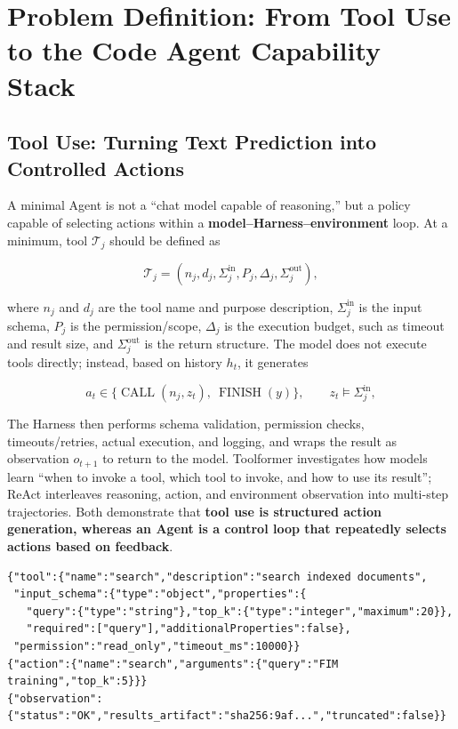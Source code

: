 \documentclass[10pt,a4paper,UTF8,fontset=none]{ctexart}
\begin{document}
\clearpage
\section{Problem Definition: From Tool Use to the Code Agent Capability Stack}

\subsection{Tool Use: Turning Text Prediction into Controlled Actions}

A minimal Agent is not a ``chat model capable of reasoning,'' but a policy capable of selecting actions within a \textbf{model--Harness--environment} loop. At a minimum, tool $\mathcal{T}_j$ should be defined as

\begin{equation}
\mathcal{T}_j=(n_j,d_j,\Sigma^{\mathrm{in}}_j,P_j,\Delta_j,\Sigma^{\mathrm{out}}_j),
\label{en:eq:tool-contract}
\end{equation}

where $n_j$ and $d_j$ are the tool name and purpose description, $\Sigma^{\mathrm{in}}_j$ is the input schema, $P_j$ is the permission/scope, $\Delta_j$ is the execution budget, such as timeout and result size, and $\Sigma^{\mathrm{out}}_j$ is the return structure. The model does not execute tools directly; instead, based on history $h_t$, it generates

\begin{equation}
a_t\in\{\operatorname{CALL}(n_j,z_t),\ \operatorname{FINISH}(y)\},\qquad z_t\models\Sigma^{\mathrm{in}}_j,
\label{en:eq:tool-action}
\end{equation}

The Harness then performs schema validation, permission checks, timeouts/retries, actual execution, and logging, and wraps the result as observation $o_{t+1}$ to return to the model. Toolformer investigates how models learn ``when to invoke a tool, which tool to invoke, and how to use its result''\cite{en:schick2023toolformer}; ReAct interleaves reasoning, action, and environment observation into multi-step trajectories\cite{en:yao2023react}. Both demonstrate that \textbf{tool use is structured action generation, whereas an Agent is a control loop that repeatedly selects actions based on feedback}.

\begin{lstlisting}[style=codeblock,caption={A minimal search-tool contract and one invocation}]
{"tool":{"name":"search","description":"search indexed documents",
 "input_schema":{"type":"object","properties":{
   "query":{"type":"string"},"top_k":{"type":"integer","maximum":20}},
   "required":["query"],"additionalProperties":false},
 "permission":"read_only","timeout_ms":10000}}
{"action":{"name":"search","arguments":{"query":"FIM training","top_k":5}}}
{"observation":{"status":"OK","results_artifact":"sha256:9af...","truncated":false}}
\end{lstlisting}
\end{document}
